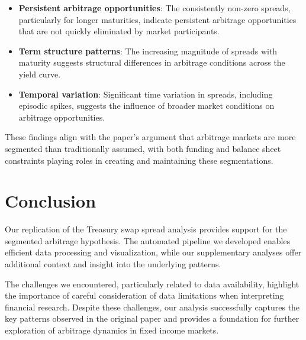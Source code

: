 \documentclass[12pt]{article}
\begin{document}
\begin{itemize}
    \item \textbf{Persistent arbitrage opportunities}: The consistently non-zero spreads, particularly for longer maturities, indicate persistent arbitrage opportunities that are not quickly eliminated by market participants.
    
    \item \textbf{Term structure patterns}: The increasing magnitude of spreads with maturity suggests structural differences in arbitrage conditions across the yield curve.
    
    \item \textbf{Temporal variation}: Significant time variation in spreads, including episodic spikes, suggests the influence of broader market conditions on arbitrage opportunities.
\end{itemize}

These findings align with the paper's argument that arbitrage markets are more segmented than traditionally assumed, with both funding and balance sheet constraints playing roles in creating and maintaining these segmentations.

\section{Conclusion}

Our replication of the Treasury swap spread analysis provides support for the segmented arbitrage hypothesis. The automated pipeline we developed enables efficient data processing and visualization, while our supplementary analyses offer additional context and insight into the underlying patterns.

The challenges we encountered, particularly related to data availability, highlight the importance of careful consideration of data limitations when interpreting financial research. Despite these challenges, our analysis successfully captures the key patterns observed in the original paper and provides a foundation for further exploration of arbitrage dynamics in fixed income markets.



\end{document}
